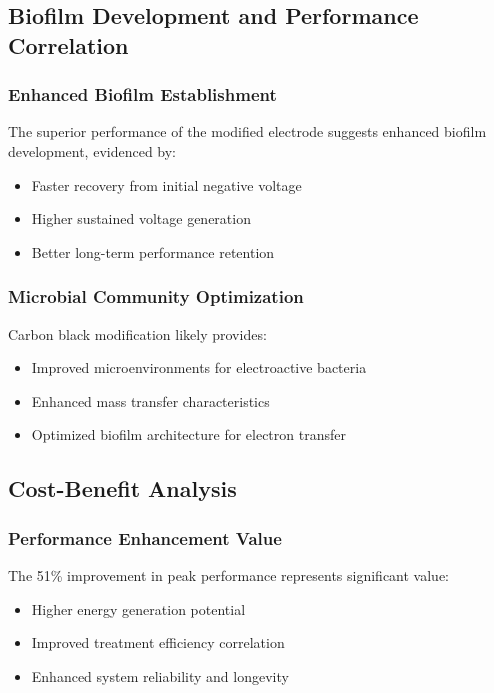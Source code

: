 \documentclass[12pt,a4paper]{article}
\begin{document}
\subsection{Biofilm Development and Performance Correlation}

\subsubsection{Enhanced Biofilm Establishment}

The superior performance of the modified electrode suggests enhanced biofilm development, evidenced by:
\begin{itemize}
    \item Faster recovery from initial negative voltage
    \item Higher sustained voltage generation
    \item Better long-term performance retention
\end{itemize}

\subsubsection{Microbial Community Optimization}

Carbon black modification likely provides:
\begin{itemize}
    \item Improved microenvironments for electroactive bacteria
    \item Enhanced mass transfer characteristics
    \item Optimized biofilm architecture for electron transfer
\end{itemize}

\subsection{Cost-Benefit Analysis}

\subsubsection{Performance Enhancement Value}

The 51\% improvement in peak performance represents significant value:
\begin{itemize}
    \item Higher energy generation potential
    \item Improved treatment efficiency correlation
    \item Enhanced system reliability and longevity
\end{itemize}
\end{document}
